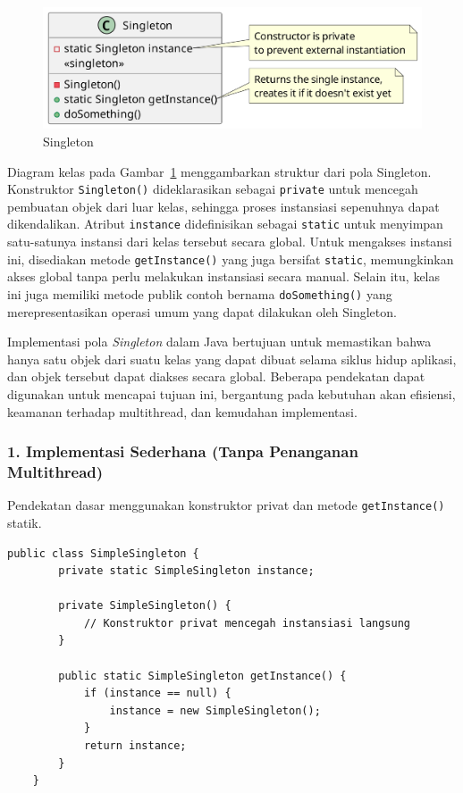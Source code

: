 \begin{figure}[h]
	\centering
	\includegraphics[width=.9\textwidth]{../figures/out/singleton.png}
	\caption{Singleton}
	\label{fig:singleton}
\end{figure}

Diagram kelas pada Gambar~\ref{fig:singleton} menggambarkan struktur dari pola Singleton. Konstruktor \texttt{Singleton()} dideklarasikan sebagai \texttt{private} untuk mencegah pembuatan objek dari luar kelas, sehingga proses instansiasi sepenuhnya dapat dikendalikan. Atribut \texttt{instance} didefinisikan sebagai \texttt{static} untuk menyimpan satu-satunya instansi dari kelas tersebut secara global. Untuk mengakses instansi ini, disediakan metode \texttt{getInstance()} yang juga bersifat \texttt{static}, memungkinkan akses global tanpa perlu melakukan instansiasi secara manual. Selain itu, kelas ini juga memiliki metode publik contoh bernama \texttt{doSomething()} yang merepresentasikan operasi umum yang dapat dilakukan oleh Singleton.


Implementasi pola \textit{Singleton} dalam Java bertujuan untuk memastikan bahwa hanya satu objek dari suatu kelas yang dapat dibuat selama siklus hidup aplikasi, dan objek tersebut dapat diakses secara global. Beberapa pendekatan dapat digunakan untuk mencapai tujuan ini, bergantung pada kebutuhan akan efisiensi, keamanan terhadap multithread, dan kemudahan implementasi.

\subsubsection*{1. Implementasi Sederhana (Tanpa Penanganan Multithread)}

Pendekatan dasar menggunakan konstruktor privat dan metode \texttt{getInstance()} statik.

\begin{lstlisting}[style=JavaStyle]
	public class SimpleSingleton {
		private static SimpleSingleton instance;
		
		private SimpleSingleton() {
			// Konstruktor privat mencegah instansiasi langsung
		}
		
		public static SimpleSingleton getInstance() {
			if (instance == null) {
				instance = new SimpleSingleton();
			}
			return instance;
		}
	}
\end{lstlisting}


